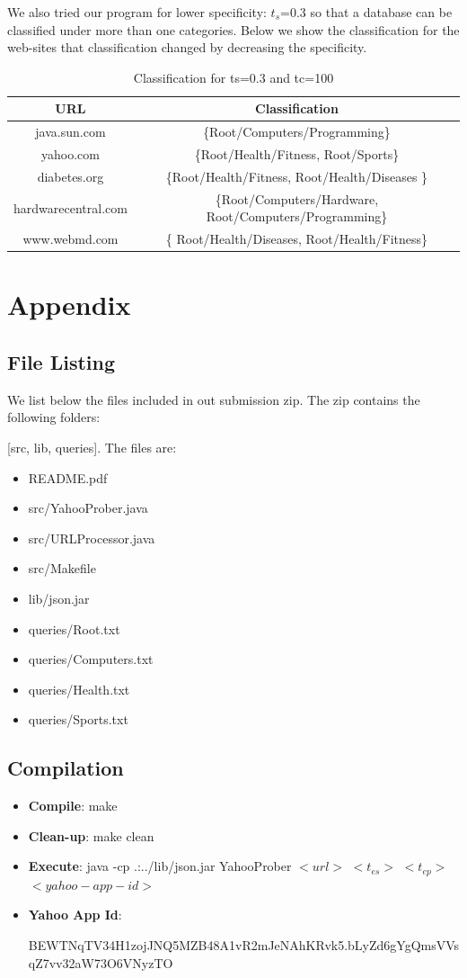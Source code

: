 \documentclass[11pt]{article}
\begin{document}
We also tried our program for lower  specificity: $t_s$=0.3 so that a database can be classified under more than one categories. Below we show the classification for the web-sites that classification changed
by decreasing the specificity.
\begin{table}
\begin{tabular}{|c|c|}
\hline
\textbf{URL} & \textbf{Classification}\\
\hline
java.sun.com & \{Root/Computers/Programming\} \\
\hline
yahoo.com& \{Root/Health/Fitness, Root/Sports\}\\
\hline
diabetes.org& \{Root/Health/Fitness,
Root/Health/Diseases \}\\
\hline
hardwarecentral.com& \{Root/Computers/Hardware, Root/Computers/Programming\}\\
\hline
www.webmd.com & \{ Root/Health/Diseases, Root/Health/Fitness\} \\
\hline
\end{tabular}
\caption{Classification for ts=0.3 and tc=100}
\label{Res2}
\end{table}

\section* {Appendix}

\subsection* {File Listing}

We list below the files included in out submission zip. The zip contains the following folders:

[src, lib, queries].
The files are:
\begin{itemize}
\item README.pdf
\item src/YahooProber.java
\item src/URLProcessor.java
\item src/Makefile
\item lib/json.jar
\item queries/Root.txt
\item queries/Computers.txt
\item queries/Health.txt
\item queries/Sports.txt
\end{itemize}

\subsection* {Compilation}
\begin{itemize}
\item \textbf{Compile}: make
\item \textbf{Clean-up}: make clean
\item\textbf{Execute}: java -cp .:../lib/json.jar YahooProber $<url>$ $<t_{es}>$ $<t_{ep}>$ $<yahoo-app-id>$
\item \textbf{Yahoo App Id}:

BEWTNqTV34H1zojJNQ5MZB48A1vR2mJeNAhKRvk5.bLyZd6gYgQmsVVsqZ7vv32aW73O6VNyzTO
\end{itemize}
\end{document}
